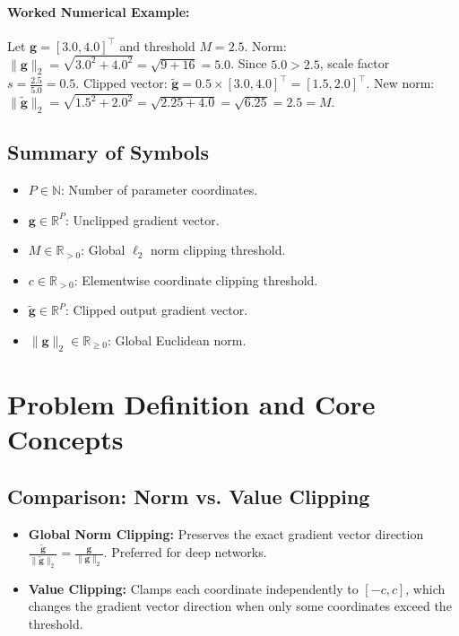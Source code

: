 \documentclass[11pt]{article}
\begin{document}
\paragraph{Worked Numerical Example:}
Let $\mathbf{g} = [3.0, 4.0]^\top$ and threshold $M = 2.5$.
Norm: $\|\mathbf{g}\|_2 = \sqrt{3.0^2 + 4.0^2} = \sqrt{9 + 16} = 5.0$.
Since $5.0 > 2.5$, scale factor $s = \frac{2.5}{5.0} = 0.5$.
Clipped vector: $\tilde{\mathbf{g}} = 0.5 \times [3.0, 4.0]^\top = [1.5, 2.0]^\top$.
New norm: $\|\tilde{\mathbf{g}}\|_2 = \sqrt{1.5^2 + 2.0^2} = \sqrt{2.25 + 4.0} = \sqrt{6.25} = 2.5 = M$.

\subsection{Summary of Symbols}
\begin{itemize}
    \item $P \in \mathbb{N}$: Number of parameter coordinates.
    \item $\mathbf{g} \in \mathbb{R}^P$: Unclipped gradient vector.
    \item $M \in \mathbb{R}_{>0}$: Global $\ell_2$ norm clipping threshold.
    \item $c \in \mathbb{R}_{>0}$: Elementwise coordinate clipping threshold.
    \item $\tilde{\mathbf{g}} \in \mathbb{R}^P$: Clipped output gradient vector.
    \item $\|\mathbf{g}\|_2 \in \mathbb{R}_{\ge 0}$: Global Euclidean norm.
\end{itemize}

\section{Problem Definition and Core Concepts}
\label{sec:problem_definition}

\subsection{Comparison: Norm vs. Value Clipping}
\begin{itemize}
    \item \textbf{Global Norm Clipping:} Preserves the exact gradient vector direction $\frac{\tilde{\mathbf{g}}}{\|\tilde{\mathbf{g}}\|_2} = \frac{\mathbf{g}}{\|\mathbf{g}\|_2}$. Preferred for deep networks.
    \item \textbf{Value Clipping:} Clamps each coordinate independently to $[-c, c]$, which changes the gradient vector direction when only some coordinates exceed the threshold.
\end{itemize}
\end{document}
